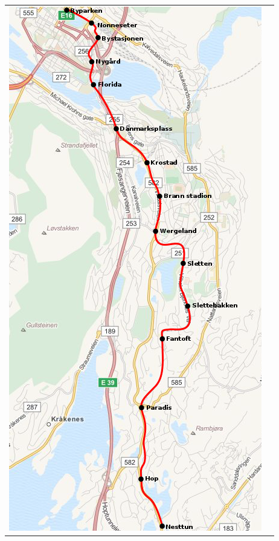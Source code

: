 \documentclass[xcolor=dvipsnames]{beamer}
\begin{document}
\begin{frame}
\begin{tabular}{lc}
\begin{minipage}{.4\linewidth}
      \includegraphics[height=.8\textheight]{data/Bergen_Karte.png}
    \end{minipage}
  \end{tabular}
\end{frame}

\end{document}
